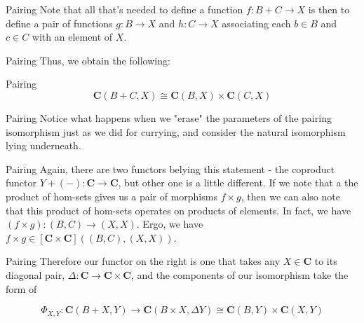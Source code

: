 \documentclass[tikz]{beamer}
\theoremstyle{definition}
\newcommand{\cat}[1]{\mathbf{#1}}
\begin{document}
\begin{frame}{Pairing}
    Note that all that's needed to define a function $f: B + C \to X$ is then to define a pair of functions $g: B \to X$ and $h: C \to X$ associating each $b \in B$ and $c \in C$ with an element of $X$. 

\end{frame}

\begin{frame}{Pairing}
Thus, we obtain the following: 

\begin{block}{Pairing}
    \begin{equation*}
        \mathbf{C}(B + C, X) \cong \mathbf{C}(B, X) \times \mathbf{C}(C, X)
    \end{equation*}{}
\end{block}{}
\end{frame}

\begin{frame}{Pairing}
    Notice what happens when we "erase" the parameters of the pairing isomorphism just as we did for currying, and consider the natural isomorphism lying underneath. 
\end{frame}

\begin{frame}{Pairing}
    Again, there are two functors belying this statement - the coproduct functor $Y + (-): \cat{C} \to \cat{C}$, but other one is a little different. If we note that a the product of hom-sets gives us a pair of morphisms $f \times g$, then we can also note that this product of hom-sets operates on products of elements. In fact, we have $(f \times g): (B, C) \to (X,X)$. Ergo, we have $f \times g \in \cat{[C \times C]}((B,C), (X,X))$.
\end{frame}

\begin{frame}{Pairing}
    Therefore our functor on the right is one that takes any $X \in \cat{C}$ to its diagonal pair, $\Delta: \cat{C} \to \cat{C} \times \cat{C}$, and the components of our isomorphism take the form of 
    
    \begin{center}
    	\begin{equation*}
		\Phi_{X,Y} : \cat{C}(B + X, Y) \to \cat{C}(B \times X, \Delta Y) \cong \cat{C}(B, Y) \times \cat{C}(X, Y)
	\end{equation*}
    \end{center}
\end{frame}
\end{document}
